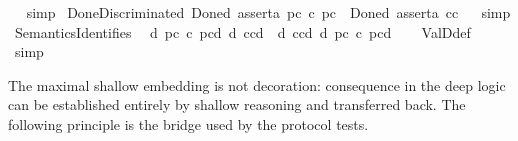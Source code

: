 \begin{isabellebody}
\isadelimproof
\ %
\endisadelimproof
%
\isatagproof
{}\isamarkupfalse%
\ simp%
\endisatagproof
{\isafoldproof}%
%
\isadelimproof
%
\endisadelimproof
\isanewline
{}\isamarkupfalse%
\ DoneDiscriminated{\isacharcolon}{\kern0pt}\ {\isachardoublequoteopen}Done\isactrlsup d\ assert{\isacharbrackleft}{\kern0pt}a{\isacharcomma}{\kern0pt}\ p\isactrlsup c\ {\isasymsupset}\isactrlsup c\ p\isactrlsup c{\isacharbrackright}{\kern0pt}\ {\isasymnoteq}\ Done\isactrlsup d\ assert{\isacharbrackleft}{\kern0pt}a{\isacharcomma}{\kern0pt}\ {\isasymnot}\isactrlsup c{\isasymbottom}\isactrlsup c{\isacharbrackright}{\kern0pt}{\isachardoublequoteclose}%
\isadelimproof
\ %
\endisadelimproof
%
\isatagproof
{}\isamarkupfalse%
\ simp%
\endisatagproof
{\isafoldproof}%
%
\isadelimproof
%
\endisadelimproof
\isanewline
{}\isamarkupfalse%
\ SemanticsIdentifies{\isacharcolon}{\kern0pt}\isanewline
\ \ {\isachardoublequoteopen}{\isasymTurnstile}\isactrlsup d\ {\isacharparenleft}{\kern0pt}{\isacharbraceleft}{\kern0pt}p\isactrlsup c\ {\isasymsupset}\isactrlsup c\ p\isactrlsup c{\isacharbraceright}{\kern0pt}\isactrlsup d\ {\isasymsupset}\isactrlsup d\ {\isacharbraceleft}{\kern0pt}{\isasymnot}\isactrlsup c{\isasymbottom}\isactrlsup c{\isacharbraceright}{\kern0pt}\isactrlsup d{\isacharparenright}{\kern0pt}\ {\isasymand}\ {\isasymTurnstile}\isactrlsup d\ {\isacharparenleft}{\kern0pt}{\isacharbraceleft}{\kern0pt}{\isasymnot}\isactrlsup c{\isasymbottom}\isactrlsup c{\isacharbraceright}{\kern0pt}\isactrlsup d\ {\isasymsupset}\isactrlsup d\ {\isacharbraceleft}{\kern0pt}p\isactrlsup c\ {\isasymsupset}\isactrlsup c\ p\isactrlsup c{\isacharbraceright}{\kern0pt}\isactrlsup d{\isacharparenright}{\kern0pt}{\isachardoublequoteclose}\isanewline
%
\isadelimproof
\ \ %
\endisadelimproof
%
\isatagproof
{}\isamarkupfalse%
\ ValD{\isacharunderscore}{\kern0pt}def\ \isamarkupfalse%
\ simp%
\endisatagproof
{\isafoldproof}%
%
\isadelimproof
%
\endisadelimproof
%
\isadelimdocument
%
\endisadelimdocument
%
\isatagdocument
%
\isamarkuptrue%
%
\endisatagdocument
{\isafolddocument}%
%
\isadelimdocument
%
\endisadelimdocument
%
\begin{isamarkuptext}%
The maximal shallow embedding is not decoration: consequence in the deep
logic can be established entirely by shallow reasoning and transferred back. The
following principle is the bridge used by the protocol tests.%
\end{isamarkuptext}\isamarkuptrue%

\end{isabellebody}
